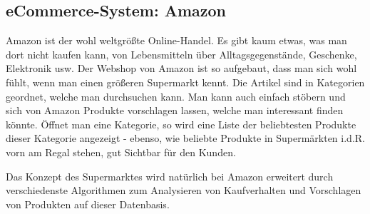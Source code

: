 \documentclass[a4paper,10pt]{article}
\begin{document}
\kopf
\renewcommand{\figurename}{Figure}


\subsection{eCommerce-System: Amazon}
Amazon ist der wohl weltgrößte Online-Handel. Es gibt kaum etwas, was man dort nicht kaufen kann, von Lebensmitteln über Alltagsgegenstände, Geschenke, Elektronik usw. Der Webshop von Amazon ist so aufgebaut, dass man sich wohl fühlt, wenn man einen größeren Supermarkt kennt. Die Artikel sind in Kategorien geordnet, welche man durchsuchen kann. Man kann auch einfach stöbern und sich von Amazon Produkte vorschlagen lassen, welche man interessant finden könnte. 
Öffnet man eine Kategorie, so wird eine Liste der beliebtesten Produkte dieser Kategorie angezeigt - ebenso, wie beliebte Produkte in Supermärkten i.d.R. vorn am Regal stehen, gut Sichtbar für den Kunden.

Das Konzept des Supermarktes wird natürlich bei Amazon erweitert durch verschiedenste Algorithmen zum Analysieren von Kaufverhalten und Vorschlagen von Produkten auf dieser Datenbasis.
\end{document}

